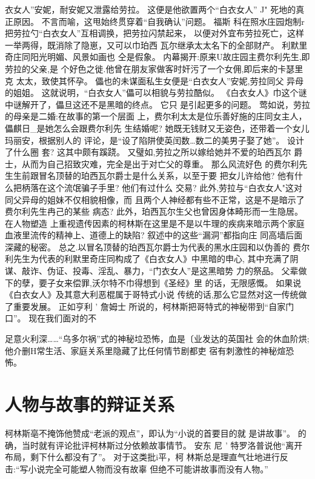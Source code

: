 \documentclass[portrait,a4paper]{article}
\begin{document}
衣女人”安妮，耐安妮又泄露给劳拉。 这便是他欲置两个“白衣女人” J"
死地的真正原因。 不言而喻，这甩始终贯穿着“自我确认”问题。 福斯
科在照水庄园炮制r把劳拉勺“白衣女人”互相调换，把劳拉闪禁起来，
以便对外宜布劳拉死亡，这样一举两得，既消除了隐崽，又可以巾珀西
瓦尔继承太太名下的全部财产。 利默里奇庄同阳光明媚、风景如画也
仝是假象。 内幕揭开:原来U故庄园主费尔利先生,即劳拉的父亲,是
个好色之徙.他曾在朋友家做客时奸污了一个女佣,即后来的卡瑟里克
太太，致使其怀孕。 儡也的未谋面私生女便是“白衣女人”安妮,劳拉同父
异母的姐姐。 这就说明，“白衣女人”儡可以相貌与劳拉酷似。
《白衣女人》巾这个谜中谜解开了，儡旦这还不是黑暗的终点。 它只
是引起更多的问题。 莺如说，劳拉的母亲是二婚:在故事的第一个层面
上，费尔利太太是位乐善好施的庄同女主人，儡麒日_是她怎么会跟费尔利先
生结婚呢? 她既无钱财又无姿色，还带着一个女儿玛丽安，根据别人的
评论，是“设了陷阱使英闰数…数二的美男子娶了她”。 设计了什么圈
套? 这其中颇有蹊跷。 又璧如,劳拉之所以嫁给她并不爱的珀西瓦尔
爵士，从而为自己招致灾难，完全是出于对亡父的尊重。 那么风流好色
的费尔利先生生前跟冒名顶替的珀西瓦尔爵士是什么关系，以至于要
把女儿许给他? 他有什么把柄落在这个流氓骗子手里? 他们有过什么
交易? 此外,劳拉与“白衣女人"这对同父异母的姐妹不仅相貌相像，而
且两个人神经都有些不正常，这是不是暗示了费尔利先生冉己的某些
病态? 此外，珀西瓦尔生父也曾因身体畸形而一生隐居。 在人物塑造
上重视遗传因素的柯林斯在这里是不是以牛理的疾病来暗示两个家庭
血液里流传的精神上、道德上的缺陷? 叙述中的这些“漏洞”都指向庄
同高墙后面深藏的秘密。
总之.以冒名顶替的珀西瓦尔爵士为代表的黑水庄园和以伪善的
费尔利先生为代表的利默里奇庄同构成了《白衣女人》中黑暗的申心,
其中充满了阴谋、敲诈、伪证、投毒、淫乱、暴力，“门衣女人”是这黑暗势
力的祭品。 父辈做下的孽，要子女来偿罪,沃尔特不巾得想到《圣经》里
的话，无限感慨。 如果说《白衣女人》及其意大利恶棍属于哥特式小说
传统的话,那么它显然对这一传统做了重要发展。 正如亨利 ' 詹姆士
所说的，柯林斯把哥特式的神秘带到“自家门口”。 现在我们面对的不

足意火利深……“乌多尔祸”式的神秘垃恐怖，血是〔业发达的英国社
会的休血阶烘;他介删H常生活、家庭关系里隐藏了比任何情节剧都吏
宿有刺激性的神秘煊恐怖。

\section{人物与故事的辩证关系}

柯林斯亳不掩饰他赞成“老派的观点”，即认为“小说的首要目的就
是讲故事”。 的确，当时就有评论批评柯林斯过分依赖故事情节。 安东
尼 ' 特罗洛普说他“离开布局，剩下什么都没有了”。 对于这类批i平，柯
林斯总是理直气壮地进行反击:“写小说完全可能塑人物而没有故辜
但绝不可能讲故事而没有人物。”
\end{document}
